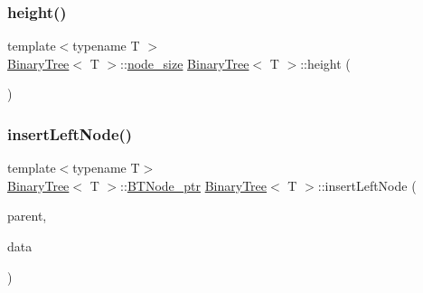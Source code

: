 \mbox{\label{class_binary_tree_a8db912740f7cbedb56799a59652ff80e}} 
\subsubsection{\texorpdfstring{height()}{height()}}
{\footnotesize\ttfamily template$<$typename T $>$ \\
\hyperlink{class_binary_tree}{Binary\+Tree}$<$ T $>$\+::\hyperlink{class_binary_tree_a6c9d1d57bf13ca658fe926a0c7255ecf}{node\+\_\+size} \hyperlink{class_binary_tree}{Binary\+Tree}$<$ T $>$\+::height (\begin{DoxyParamCaption}\item[{void}]{ }\end{DoxyParamCaption})}

\mbox{\label{class_binary_tree_a3f9a69eef172b096c09c75aa3317bda1}} 
\subsubsection{\texorpdfstring{insert\+Left\+Node()}{insertLeftNode()}}
{\footnotesize\ttfamily template$<$typename T$>$ \\
\hyperlink{class_binary_tree}{Binary\+Tree}$<$ T $>$\+::\hyperlink{class_binary_tree_a35ef67d8ee2843144c5c309c5a6ecd5b}{B\+T\+Node\+\_\+ptr} \hyperlink{class_binary_tree}{Binary\+Tree}$<$ T $>$\+::insert\+Left\+Node (\begin{DoxyParamCaption}\item[{\hyperlink{class_binary_tree_a35ef67d8ee2843144c5c309c5a6ecd5b}{B\+T\+Node\+\_\+ptr}}]{parent,  }\item[{T}]{data }\end{DoxyParamCaption})\hspace{0.3cm}{\ttfamily [protected]}}

\mbox{\label{class_binary_tree_ade1255b6ba7ae7af6922459c59ac2e8c}} 
